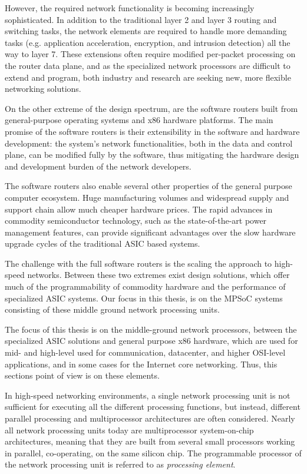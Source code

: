 However, the required network functionality is becoming increasingly sophisticated. In addition to the traditional layer 2 and layer 3 routing and switching tasks, the network elements are required to handle more demanding tasks (e.g. application acceleration, encryption, and intrusion detection) all the way to layer 7. These extensions often require modified per-packet processing on the router data plane, and as the specialized network processors are difficult to extend and program, both industry and research are seeking new, more flexible networking solutions.~\cite{Egi:2009:PP, Dobrescu:2009:REP}

On the other extreme of the design spectrum, are the software routers built from general-purpose operating systems and x86 hardware platforms. The main promise of the software routers is their extensibility in the software and hardware development: the system's network functionalities, both in the data and control plane, can be modified fully by the software, thus mitigating the hardware design and development burden of the network developers.~\cite{Dobrescu:2009:REP}

The software routers also enable several other properties of the general purpose computer ecosystem. Huge manufacturing volumes and widespread supply and support chain allow much cheaper hardware prices. The rapid advances in commodity semiconductor technology, such as the state-of-the-art power management features, can provide significant advantages over the slow hardware upgrade cycles of the traditional ASIC based systems.~\cite{Dobrescu:2009:REP}

The challenge with the full software routers is the scaling the approach to high-speed networks. Between these two extremes exist design solutions, which offer much of the programmability of commodity hardware and the performance of specialized ASIC systems. Our focus in this thesis, is on the MPSoC systems consisting of these middle ground network processing units.~\cite{Dobrescu:2009:REP}

The focus of this thesis is on the middle-ground network processors, between the specialized ASIC solutions and general purpose x86 hardware, which are used for mid- and high-level used for communication, datacenter, and higher OSI-level applications, and in some cases for the Internet core networking. Thus, this sections point of view is on these elements.

In high-speed networking environments, a single network processing unit is not sufficient for executing all the different processing functions, but instead, different parallel processing and multiprocessor architectures are often considered. Nearly all network processing units today are multiprocessor system-on-chip architectures, meaning that they are built from several small processors working in parallel, co-operating, on the same silicon chip. The programmable processor of the network processing unit is referred to as \emph{processing element}.~\cite{Giladi:2008:Network, Papaefstathiou:2005:Queue}

